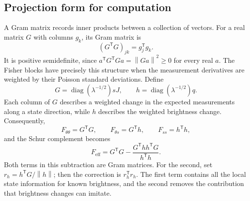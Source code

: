 \documentclass[11pt,a4paper]{article}
\newcommand{\diag}{\operatorname{diag}}
\newcommand{\norm}[1]{\left\lVert#1\right\rVert}
\begin{document}
\subsection{Projection form for computation}

A Gram matrix records inner products between a collection of vectors.
For a real matrix $G$ with columns $g_k$, its Gram matrix is
\begin{equation}
 (G^{\mathsf T}G)_{jk}=g_j^{\mathsf T}g_k.
\end{equation}
It is positive semidefinite, since
$a^{\mathsf T}G^{\mathsf T}Ga=\norm{Ga}^2\ge0$ for every real $a$.
The Fisher blocks have precisely this structure when the measurement
derivatives are weighted by their Poisson standard deviations. Define
\begin{equation}
 G=\diag(\lambda^{-1/2})sJ,\qquad
 h=\diag(\lambda^{-1/2})q.
\end{equation}
Each column of $G$ describes a weighted change in the expected measurements
along a state direction, while $h$ describes the weighted brightness change.
Consequently,
\begin{equation}
 F_{\theta\theta}=G^{\mathsf T}G,\qquad
 F_{\theta s}=G^{\mathsf T}h,\qquad F_{ss}=h^{\mathsf T}h,
\end{equation}
and the Schur complement becomes
\begin{equation}
 F_{\mathrm{eff}}=G^{\mathsf T}G
 -\frac{G^{\mathsf T}hh^{\mathsf T}G}{h^{\mathsf T}h}.
 \label{eq:gram-subtraction}
\end{equation}
Both terms in this subtraction are Gram matrices. For the second, set
$r_h=h^{\mathsf T}G/\norm{h}$; then the correction is
$r_h^{\mathsf T}r_h$. The first term contains all the local state
information for known brightness, and the second removes the contribution
that brightness changes can imitate.
\end{document}
